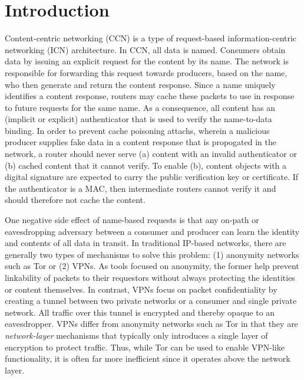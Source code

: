 \section{Introduction}
Content-centric networking (CCN) is a type of request-based information-centric
networking (ICN) architecture. In CCN, all data is named. Consumers obtain data
by issuing an explicit request for the content by its name. The network is
responsible for forwarding this request towards producers, based on the name,
who then generate and return the content response. Since a name uniquely identifies
a content response, routers may cache these packets to use in response to
future requests for the same name. As a consequence, all content has an (implicit
or explicit) authenticator that is used to verify the name-to-data binding. In
order to prevent cache poisoning attachs, wherein a malicious producer supplies
fake data in a content response that is propogated in the network, a router
should never serve (a) content with an invalid authenticator or (b) cached
content that it cannot verify. To enable (b), content objects with a digital
signature are expected to carry the public verification key or certificate. If the
authenticator is a MAC, then intermediate routers cannot verify it and should
therefore not cache the content.

One negative side effect of name-based requests is that any on-path or
eavesdropping adversary between a consumer and producer can learn the identity
and contents of all data in transit. In traditional IP-based networks, there are
generally two types of mechanisms to solve this problem: (1) anonymity
networks such as Tor \cite{tor} or (2) VPNs. As tools focused on anonymity,
the former help prevent linkability of packets to their requestors without
always protecting the identities or content themselves. In contrast, VPNs focus
on packet confidentiality by creating a tunnel between two private networks
or a consumer and single private network. All traffic over this tunnel is
encrypted and thereby opaque to an eavesdropper. VPNs differ from anonymity
networks such as Tor in that they are \emph{network-layer} mechanisms that
typically only introduces a single layer of encryption to protect traffic.
Thus, while Tor can be used to enable VPN-like functionality, it is often
far more inefficient since it operates above the network layer.

